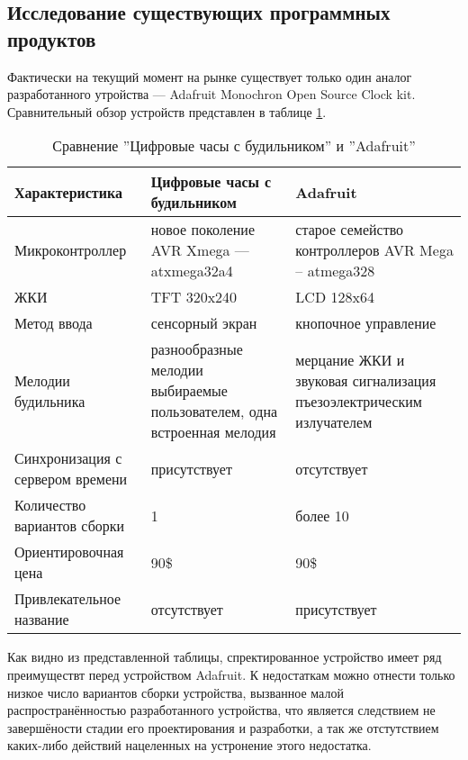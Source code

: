 \subsection{Исследование существующих программных продуктов}
\begin{par}
Фактически на текущий момент на рынке существует только один аналог разработанного
утройства ---  Adafruit Monochron Open Source Clock kit.
Сравнительный обзор устройств представлен в таблице \ref{table:compare}.
\end{par}


\begin{par}
\begin{table}
\caption{Сравнение ''Цифровые часы с будильником'' и ''Adafruit''}
\begin{tabular}{|l|p{4cm}|p{4cm}|}
\hline{}
Характеристика & Цифровые часы с\linebreak{} будильником & Adafruit \\
\hline{}
Микроконтроллер & новое поколение AVR Xmega --- atxmega32a4 & старое семейство контроллеров AVR Mega -- atmega328 \\
\hline{}
ЖКИ & TFT 320x240 & LCD 128x64 \\
\hline{}
Метод ввода & сенсорный экран & кнопочное управление \\
\hline{}
Мелодии будильника & разнообразные мелодии выбираемые пользователем, одна встроенная мелодия & мерцание ЖКИ и звуковая сигнализация пъезоэлектрическим излучателем \\
\hline{}
Синхронизация с сервером времени & присутствует & отсутствует \\
\hline{}
Количество вариантов сборки & 1 & более 10 \\
\hline{}
Ориентировочная цена & 90\$ & 90\$ \\ 
\hline{}
Привлекательное название & отсутствует & присутствует \\ 
\hline
\end{tabular}
\label{table:compare}
\end{table}

Как видно из представленной таблицы, спректированное устройство имеет ряд преимуществт перед
устройством Adafruit. К недостаткам можно отнести только низкое число вариантов сборки устройства,
вызванное малой распространённостью разработанного устройства, что является
следствием не завершёности стадии его проектирования и разработки, а так же отстутствием каких-либо
действий нацеленных на устронение этого недостатка.
\end{par}
\newpage{}

